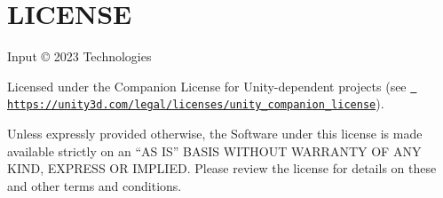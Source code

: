 \chapter{LICENSE}
\hypertarget{md__hey_tea_9_2_library_2_package_cache_2com_8unity_8inputsystem_0d1_86_83_2_l_i_c_e_n_s_e}{}\label{md__hey_tea_9_2_library_2_package_cache_2com_8unity_8inputsystem_0d1_86_83_2_l_i_c_e_n_s_e}
Input  © 2023  Technologies

Licensed under the  Companion License for Unity-\/dependent projects (see \href{https://unity3d.com/legal/licenses/unity_companion_license}{\texttt{ https\+://unity3d.\+com/legal/licenses/unity\+\_\+companion\+\_\+license}}).

Unless expressly provided otherwise, the Software under this license is made available strictly on an “\+AS IS” BASIS WITHOUT WARRANTY OF ANY KIND, EXPRESS OR IMPLIED. Please review the license for details on these and other terms and conditions. 